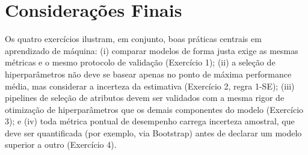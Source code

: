 \documentclass[12pt,a4paper]{article}
\begin{document}
\section{Considerações Finais}

Os quatro exercícios ilustram, em conjunto, boas práticas centrais em aprendizado de máquina: (i) comparar modelos de forma justa exige as mesmas métricas e o mesmo protocolo de validação (Exercício 1); (ii) a seleção de hiperparâmetros não deve se basear apenas no ponto de máxima performance média, mas considerar a incerteza da estimativa (Exercício 2, regra 1-SE); (iii) pipelines de seleção de atributos devem ser validados com a mesma rigor de otimização de hiperparâmetros que os demais componentes do modelo (Exercício 3); e (iv) toda métrica pontual de desempenho carrega incerteza amostral, que deve ser quantificada (por exemplo, via Bootstrap) antes de declarar um modelo superior a outro (Exercício 4).
\end{document}
